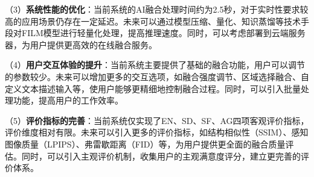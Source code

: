 （3）\textbf{系统性能的优化}：当前系统的AI融合处理时间约为2.5秒，对于实时性要求较高的应用场景仍存在一定延迟。未来可以通过模型压缩、量化、知识蒸馏等技术手段对FILM模型进行轻量化处理，提高推理速度。同时，可以考虑部署到云端服务器，为用户提供更高效的在线融合服务。

（4）\textbf{用户交互体验的提升}：当前系统主要提供了基础的融合功能，用户可以调节的参数较少。未来可以增加更多的交互选项，如融合强度调节、区域选择融合、自定义文本描述输入等，使用户能够更精细地控制融合过程。同时，可以引入批量处理功能，提高用户的工作效率。

（5）\textbf{评价指标的完善}：当前系统仅实现了EN、SD、SF、AG四项客观评价指标，评价维度相对有限。未来可以引入更多的评价指标，如结构相似性（SSIM）、感知图像质量（LPIPS）、弗雷歇距离（FID）等，为用户提供更全面的融合质量评估。同时，可以引入主观评价机制，收集用户的主观满意度评分，建立更完善的评价体系。
